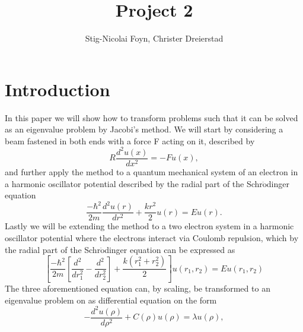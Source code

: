 \documentclass{emulateapj}
\begin{document}
\title{Project 2}

\author{Stig-Nicolai Foyn, Christer Dreierstad}




\begin{abstract}

\end{abstract}

\section{Introduction}
\label{sec:introduction}
In this paper we will show how to transform problems such that it can be solved as an eigenvalue problem by Jacobi's method. We will start by considering a beam fastened in both ends with a force F acting on it, described by
%
\begin{equation*}
    R\frac{d^2u(x)}{dx^2} = -Fu(x),
\end{equation*}
%
and further apply the method to a quantum mechanical system of an electron in a harmonic oscillator potential described by the radial part of the Schr$\ddot{\mathrm{o}}$dinger equation 
%
\begin{equation*}
    \frac{-\hbar^2}{2m}\frac{d^2u(r)}{dr^2} + \frac{kr^2}{2}u(r) = Eu(r).
\end{equation*}
%
Lastly we will be extending the method to a two electron system in a harmonic oscillator potential where the electrons interact via Coulomb repulsion, which by the radial part of the Schr$\ddot{\mathrm{o}}$dinger equation can be expressed as
%
\begin{equation*}
    \left[\frac{-\hbar^2}{2m}\left[\frac{d^2}{dr_1^2} - \frac{d^2}{dr_2^2}\right] + \frac{k(r_1^2 + r_2^2)}{2}\right]u(r_1,r_2) = Eu(r_1,r_2)
\end{equation*}
%
The three aforementioned equation can, by scaling, be transformed to an eigenvalue problem on as differential equation on the form
%
\begin{equation*}
    -\frac{d^2u(\rho)}{d\rho^2} + C(\rho)u(\rho) = \lambda u(\rho),
\end{equation*}
%
\end{document}
